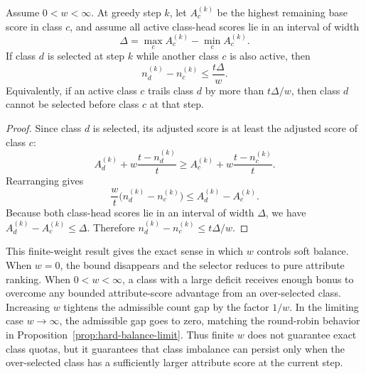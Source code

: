 \begin{tcolorbox}[
    colback=blue!2!white,
    colframe=blue!20!white,
    arc=3pt,
    boxrule=1pt,
    drop shadow,
    breakable
]
\begin{proposition}
\label{prop:finite-weight-balance}
Assume $0<w<\infty$. At greedy step $k$, let $A_c^{(k)}$ be the highest remaining base score in class $c$, and assume all active class-head scores lie in an interval of width
\begin{equation}
\label{eq:class-head-width}
\Delta = \max_c A_c^{(k)} - \min_c A_c^{(k)}.
\end{equation}
If class $d$ is selected at step $k$ while another class $c$ is also active, then
\begin{equation}
\label{eq:finite-balance-gap}
n_d^{(k)} - n_c^{(k)} \leq \frac{t\Delta}{w}.
\end{equation}
Equivalently, if an active class $c$ trails class $d$ by more than $t\Delta/w$, then class $d$ cannot be selected before class $c$ at that step.
\end{proposition}
\end{tcolorbox}

\begin{tcolorbox}[
    colback=green!2!white,
    colframe=green!20!white,
    arc=3pt,
    boxrule=1pt,
    drop shadow,
    breakable
]
\begin{proof}
Since class $d$ is selected, its adjusted score is at least the adjusted score of class $c$:
\begin{equation}
\label{eq:finite-balance-proof-start}
A_d^{(k)} + w\frac{t-n_d^{(k)}}{t}
\geq
A_c^{(k)} + w\frac{t-n_c^{(k)}}{t}.
\end{equation}
Rearranging gives
\begin{equation}
\label{eq:finite-balance-proof-rearranged}
\frac{w}{t}\big(n_d^{(k)}-n_c^{(k)}\big)
\leq A_d^{(k)}-A_c^{(k)}.
\end{equation}
Because both class-head scores lie in an interval of width $\Delta$, we have $A_d^{(k)}-A_c^{(k)}\leq\Delta$. Therefore $n_d^{(k)}-n_c^{(k)}\leq t\Delta/w$.
\end{proof}
\end{tcolorbox}

This finite-weight result gives the exact sense in which $w$ controls soft balance. When $w=0$, the bound disappears and the selector reduces to pure attribute ranking. When $0<w<\infty$, a class with a large deficit receives enough bonus to overcome any bounded attribute-score advantage from an over-selected class. Increasing $w$ tightens the admissible count gap by the factor $1/w$. In the limiting case $w\rightarrow\infty$, the admissible gap goes to zero, matching the round-robin behavior in Proposition~\ref{prop:hard-balance-limit}. Thus finite $w$ does not guarantee exact class quotas, but it guarantees that class imbalance can persist only when the over-selected class has a sufficiently larger attribute score at the current step.

